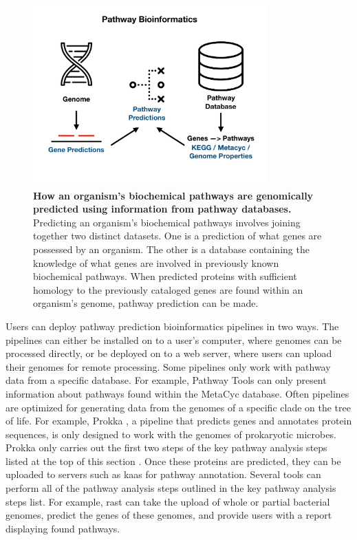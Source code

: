 \begin{figure}[!ht]
  \centering
	\includegraphics[width=0.8\textwidth]{media/pathway_bioinformatics.pdf}
	\caption[How an organism’s biochemical pathways are genomically predicted using 
information from pathway databases.]{\textbf{How an organism’s biochemical 
pathways are genomically predicted using information from pathway databases.} 
Predicting an organism’s biochemical pathways involves joining together two 
distinct datasets. One is a prediction of what genes are possessed by an 
organism. The other is a database containing the knowledge of what genes are 
involved in previously known biochemical pathways. When predicted proteins with 
sufficient homology to the previously cataloged genes are found within an 
organism’s genome, pathway prediction can be made.}
	 \label{fig:pathway-analysis-overview}
\end{figure}

Users can deploy pathway prediction bioinformatics pipelines in two ways. The 
pipelines can either be installed on to a user's computer, where genomes can be 
processed directly, or be deployed on to a web server, where users can upload 
their genomes for remote processing. Some pipelines only work with pathway data 
from a specific database. For example, Pathway Tools \cite{karp2002pathway} can 
only present information about pathways found within the MetaCyc 
\cite{karp2002metacyc} database. Often pipelines are optimized for generating 
data from the genomes of a specific clade on the tree of life. For example, 
Prokka \cite{seemann2014prokka}, a pipeline that predicts genes and annotates 
protein sequences, is only designed to work with the genomes of prokaryotic 
microbes. Prokka only carries out the first two steps of the key pathway 
analysis steps listed at the top of this section \cite{seemann2014prokka}. Once 
these proteins are predicted, they can be uploaded to servers such as \gls{kaas} 
\cite{moriya2007kaas} for pathway annotation. Several tools can perform all of 
the pathway analysis steps outlined in the key pathway analysis steps list. For 
example, \gls{rast} \cite{aziz2008rast} can take the upload of whole or partial 
bacterial genomes, predict the genes of these genomes, and provide users with a 
report displaying found pathways.

